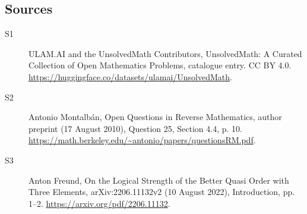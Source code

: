 \documentclass[11pt]{article}
\begin{document}
\subsection{Sources}
\begin{description}
\item[\hypertarget{source:statement:1}{S1}] ULAM.AI and the UnsolvedMath Contributors, UnsolvedMath: A Curated Collection of Open Mathematics Problems, catalogue entry. CC BY 4.0. \url{https://huggingface.co/datasets/ulamai/UnsolvedMath}.
\item[\hypertarget{source:statement:2}{S2}] Antonio Montalbán, Open Questions in Reverse Mathematics, author preprint (17 August 2010), Question 25, Section 4.4, p. 10. \url{https://math.berkeley.edu/~antonio/papers/questionsRM.pdf}.
\item[\hypertarget{source:statement:3}{S3}] Anton Freund, On the Logical Strength of the Better Quasi Order with Three Elements, arXiv:2206.11132v2 (10 August 2022), Introduction, pp. 1--2. \url{https://arxiv.org/pdf/2206.11132}.
\end{description}
\label{end:statement}
\end{document}
